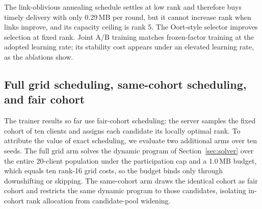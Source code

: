 \documentclass[preprint,12pt]{elsarticle}
\begin{document}
\begin{table}[t]
\centering
\caption{External baselines in the real trainer on non-IID CIFAR-10 with five seeds. Accuracy is measured at round 40. Timely delivery ratio, bytes, and delivered mean rank are averaged over rounds 30--39.}
\label{tab:ext}
\end{table}

The link-oblivious annealing schedule settles at low rank and therefore buys timely delivery with only 0.29\,MB per round, but it cannot increase rank when links improve, and its capacity ceiling is rank 5. The Oort-style selector improves selection at fixed rank. Joint A/B training matches frozen-factor training at the adopted learning rate; its stability cost appears under an elevated learning rate, as the ablations show.

\subsection{Full grid scheduling, same-cohort scheduling, and fair cohort}
\label{sec:dpvfair}
The trainer results so far use fair-cohort scheduling: the server samples the fixed cohort of ten clients and assigns each candidate its locally optimal rank. To attribute the value of exact scheduling, we evaluate two additional arms over ten seeds. The full grid arm solves the dynamic program of Section~\ref{sec:solver} over the entire 20-client population under the participation cap and a 1.0\,MB budget, which equals ten rank-16 grid costs, so the budget binds only through downshifting or skipping. The same-cohort arm draws the identical cohort as fair cohort and restricts the same dynamic program to those candidates, isolating in-cohort rank allocation from candidate-pool widening.
\end{document}

